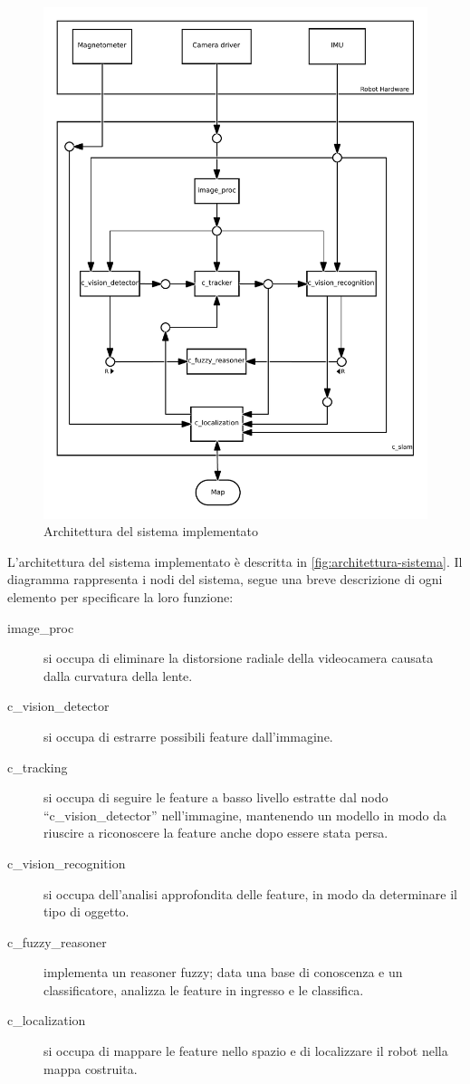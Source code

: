 \begin{figure}[ht]
  \includegraphics[width=\textwidth]{diagrammi/Sistema}
  \caption{Architettura del sistema implementato}
  \label{fig:architettura-sistema}
\end{figure}

L'architettura del sistema implementato è descritta in \autoref{fig:architettura-sistema}.
Il diagramma rappresenta i nodi del sistema, segue una breve descrizione di ogni elemento per specificare la loro funzione:

\begin{description}
  \item [image\_proc] si occupa di eliminare la distorsione radiale della videocamera causata dalla curvatura della lente.
  \item [c\_vision\_detector] si occupa di estrarre possibili feature dall'immagine.
  \item [c\_tracking] si occupa di seguire le feature a basso livello estratte dal nodo ``c\_vision\_detector'' nell'immagine, mantenendo un modello in modo da riuscire a riconoscere la feature anche dopo essere stata persa. 
  \item [c\_vision\_recognition] si occupa dell'analisi approfondita delle feature, in modo da determinare il tipo di oggetto. 
  \item [c\_fuzzy\_reasoner] implementa un reasoner fuzzy; data una base di conoscenza e un classificatore, analizza le feature in ingresso e le classifica. 
  \item [c\_localization] si occupa di mappare le feature nello spazio e di localizzare il robot nella mappa costruita.
\end{description}

